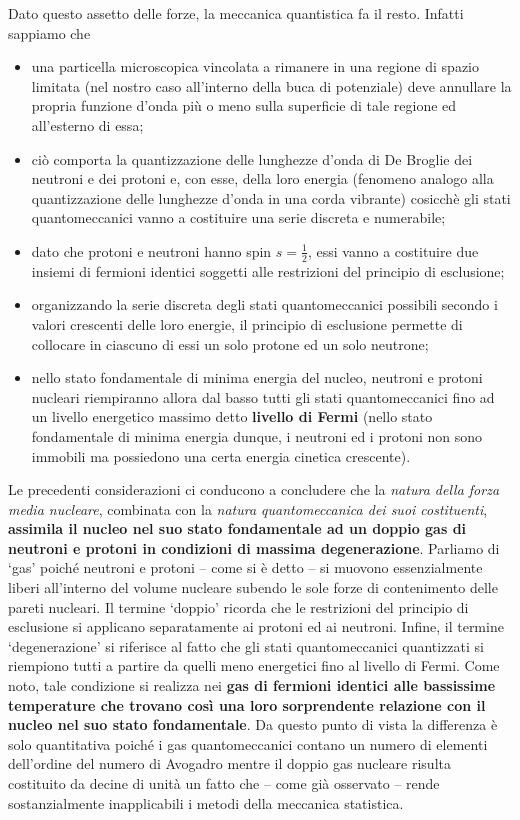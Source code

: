 Dato questo assetto delle forze, la meccanica quantistica fa il resto.
Infatti sappiamo che
\begin{itemize}
	\item una particella microscopica vincolata a rimanere in una regione di spazio
	limitata (nel nostro caso all’interno della buca di potenziale) deve annullare la propria funzione d’onda più o meno sulla superficie di tale regione ed all’esterno di essa;
	\item ciò comporta la quantizzazione delle lunghezze d’onda di De Broglie dei neutroni e dei protoni e, con esse, della loro energia (fenomeno analogo alla quantizzazione delle lunghezze d’onda in una corda vibrante) cosicchè gli stati quantomeccanici vanno a costituire una serie discreta e numerabile;
	\item dato che protoni e neutroni hanno spin $s=\frac{1}{2}$, essi vanno a costituire due insiemi di fermioni identici soggetti alle restrizioni del principio di esclusione;
	\item organizzando la serie discreta degli stati quantomeccanici possibili secondo i valori crescenti delle loro energie, il principio di esclusione permette di collocare in ciascuno di essi un solo protone ed un solo neutrone;
	\item nello stato fondamentale di minima energia del nucleo, neutroni e protoni nucleari riempiranno allora dal basso tutti gli stati quantomeccanici fino ad un livello energetico massimo detto \textbf{livello di Fermi} (nello stato fondamentale di minima energia dunque, i neutroni ed i protoni non sono immobili ma possiedono una certa energia cinetica crescente).
\end{itemize}

Le precedenti considerazioni ci conducono a concludere che la \emph{natura della forza media nucleare}, combinata con la
\emph{natura quantomeccanica dei suoi costituenti}, \textbf{assimila il nucleo nel suo stato fondamentale ad un doppio
gas di neutroni e protoni in condizioni di massima degenerazione}.
Parliamo di `gas’ poiché neutroni e protoni – come si è detto – si muovono essenzialmente liberi all’interno del volume nucleare subendo le sole forze di contenimento delle pareti nucleari.
Il termine ‘doppio’ ricorda che le restrizioni del principio di esclusione si applicano separatamente ai protoni ed ai neutroni.
Infine, il termine ‘degenerazione’ si riferisce al fatto che gli stati quantomeccanici quantizzati si riempiono tutti a partire da quelli meno energetici fino al livello di Fermi.
Come noto, tale condizione si realizza nei \textbf{gas di fermioni identici alle bassissime temperature che trovano così una loro sorprendente relazione con il nucleo nel suo stato fondamentale}.
Da questo punto di vista la differenza è solo quantitativa poiché i gas quantomeccanici contano un numero di elementi dell’ordine del numero di Avogadro mentre il doppio gas nucleare risulta costituito da decine di unità un fatto che – come già osservato – rende sostanzialmente inapplicabili i metodi della meccanica statistica.

